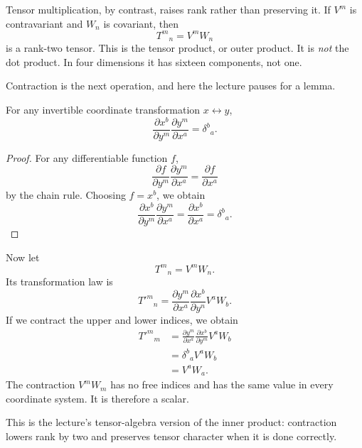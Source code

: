 Tensor multiplication, by contrast, raises rank rather than preserving it. If \(V^m\) is contravariant and \(W_n\) is covariant, then
\begin{equation}
T^m{}_n = V^m W_n
\end{equation}
is a rank-two tensor. This is the tensor product, or outer product. It is \emph{not} the dot product. In four dimensions it has sixteen components, not one.

Contraction is the next operation, and here the lecture pauses for a lemma.

\begin{proposition}
For any invertible coordinate transformation \(x \leftrightarrow y\),
\begin{equation}
\frac{\partial x^b}{\partial y^m}\frac{\partial y^m}{\partial x^a}
=
\delta^b{}_a.
\end{equation}
\end{proposition}

\begin{proof}
For any differentiable function \(f\),
\begin{equation}
\frac{\partial f}{\partial y^m}\frac{\partial y^m}{\partial x^a}
=
\frac{\partial f}{\partial x^a}
\end{equation}
by the chain rule. Choosing \(f=x^b\), we obtain
\begin{equation}
\frac{\partial x^b}{\partial y^m}\frac{\partial y^m}{\partial x^a}
=
\frac{\partial x^b}{\partial x^a}
=
\delta^b{}_a.
\end{equation}
\end{proof}

Now let
\begin{equation}
T^m{}_n = V^mW_n.
\end{equation}
Its transformation law is
\begin{equation}
T'^m{}_n
=
\frac{\partial y^m}{\partial x^a}
\frac{\partial x^b}{\partial y^n}
V^aW_b.
\end{equation}
If we contract the upper and lower indices, we obtain
\begin{align}
T'^m{}_m
&=
\frac{\partial y^m}{\partial x^a}
\frac{\partial x^b}{\partial y^m}
V^aW_b \\
&=
\delta^b{}_a V^aW_b \\
&=
V^aW_a.
\end{align}
The contraction \(V^mW_m\) has no free indices and has the same value in every coordinate system. It is therefore a scalar.

This is the lecture's tensor-algebra version of the inner product: contraction lowers rank by two and preserves tensor character when it is done correctly.

